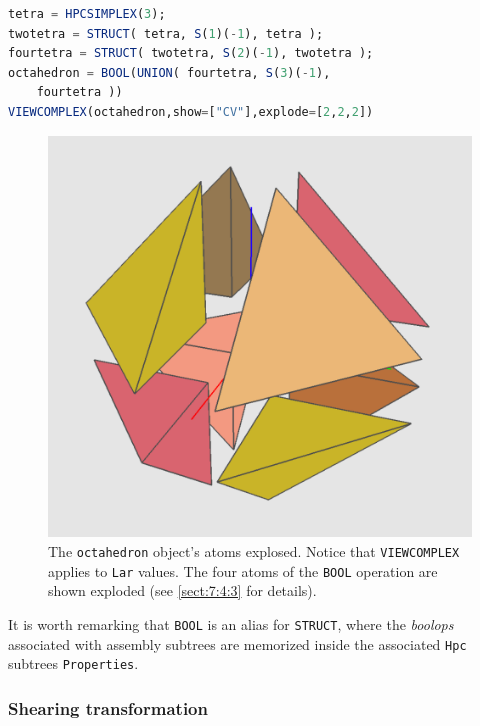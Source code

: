 \documentclass{juliacon}
\begin{document}
\begin{lstlisting}[language = Julia,numbers=none,label={lst:exmpl5},
caption={Construction of {\tt octahedron} model.}
]
tetra = HPCSIMPLEX(3);
twotetra = STRUCT( tetra, S(1)(-1), tetra );
fourtetra = STRUCT( twotetra, S(2)(-1), twotetra );
octahedron = BOOL(UNION( fourtetra, S(3)(-1), 
	fourtetra ))
VIEWCOMPLEX(octahedron,show=["CV"],explode=[2,2,2])
\end{lstlisting}
\begin{figure}[htbp] %
\includegraphics[width=0.5\linewidth]{figs/octahedron}
\caption{The {\tt octahedron} object’s atoms explosed. Notice that {\tt VIEWCOMPLEX} applies to {\tt Lar} values. The four atoms of the {\tt BOOL} operation are shown exploded (see \ref{sect:7:4:3} for details).}
\end{figure}
It is worth remarking that {\tt BOOL} is an alias for {\tt STRUCT}, where the \emph{boolops} associated with assembly subtrees are memorized inside the associated {\tt Hpc} subtrees {\tt Properties}.

\subsubsection*{Shearing transformation}\ 
\end{document}
